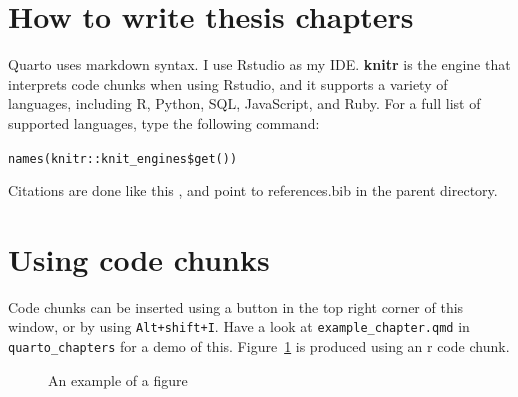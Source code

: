 \documentclass[../main.tex]{subfiles}
\begin{document}
\section{How to write thesis
chapters}\label{how-to-write-thesis-chapters}

Quarto uses markdown syntax. I use Rstudio as my IDE. \textbf{knitr} is
the engine that interprets code chunks when using Rstudio, and it
supports a variety of languages, including R, Python, SQL, JavaScript,
and Ruby. For a full list of supported languages, type the following
command:

\texttt{names(knitr::knit\_engines\$get())}

Citations are done like this \cite{strain_2023}, and point to
references.bib in the parent directory.

\section{Using code chunks}\label{using-code-chunks}

Code chunks can be inserted using a button in the top right corner of
this window, or by using \texttt{Alt+shift+I}. Have a look at
\texttt{example\_chapter.qmd} in \texttt{quarto\_chapters} for a demo of
this. Figure~\ref{fig-example} is produced using an r code chunk.

\begin{figure}


\caption{\label{fig-example}An example of a figure}

\end{figure}%
\end{document}
